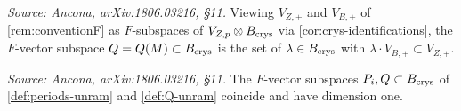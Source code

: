 \begin{definition}
  \label{def:Q-unram}
  \textit{Source: Ancona, arXiv:1806.03216, \S11.}
  Viewing \(V_{Z,+}\) and \(V_{B,+}\) of \cref{rem:conventionF} as \(F\)-subspaces
  of \(V_{Z,p} \otimes B_{\mathrm{crys}}\) via \cref{cor:crys-identifications}, the
  \(F\)-vector subspace \(Q = Q(M) \subset B_{\mathrm{crys}}\) is the set of
  \(\lambda \in B_{\mathrm{crys}}\) with \(\lambda \cdot V_{B,+} \subset V_{Z,+}\).
\end{definition}

\begin{proposition}[\(P_i = Q\), unramified case]
  \label{prop:PQ-unram}
  \textit{Source: Ancona, arXiv:1806.03216, \S11.}
  The \(F\)-vector subspaces \(P_i, Q \subset B_{\mathrm{crys}}\) of
  \cref{def:periods-unram} and \cref{def:Q-unram} coincide and have dimension
  one.
\end{proposition}

